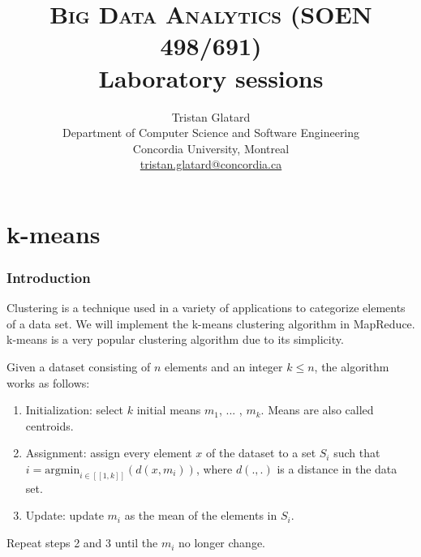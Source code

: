 \documentclass[11pt]{article}
\title{\textsc{Big Data Analytics (SOEN 498/691)} \\ Laboratory sessions}
\author{Tristan Glatard\\Department of Computer Science and Software Engineering\\Concordia University, Montreal\\\href{mailto:tristan.glatard@concordia.ca}{tristan.glatard@concordia.ca}}
\begin{document}
\maketitle

\newpage

\tableofcontents

\newpage

\part{k-means}

\section{Introduction}

Clustering is a technique used in a variety of applications to
categorize elements of a data set. We will implement the k-means
clustering algorithm in MapReduce. k-means is a very popular
clustering algorithm due to its simplicity.

Given a dataset consisting of $n$ elements and an integer $k\leq n$, the algorithm works as follows:
\begin{enumerate}
\item Initialization: select $k$ initial means $m_1$, ... , $m_k$. Means are also called centroids.
\item Assignment: assign every element $x$ of the dataset to a set
  $S_i$ such that $i=\mathrm{argmin}_{i \in [\![1,k]\!]}(d(x,m_i))$,
  where $d(.,.)$ is a distance in the data set.
\item Update: update $m_i$ as the mean of the elements in $S_i$.
\end{enumerate}
Repeat steps 2 and 3 until the $m_i$ no longer change.
\end{document}
